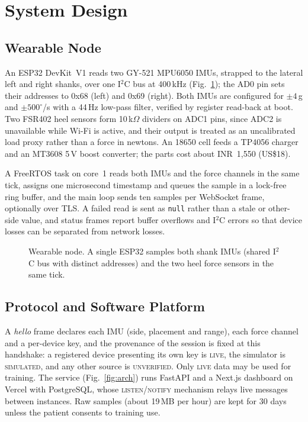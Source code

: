 \documentclass[conference]{IEEEtran}
\begin{document}
\section{System Design}

\subsection{Wearable Node}
An ESP32 DevKit~V1 reads two GY-521 MPU6050 IMUs, strapped to the lateral left and right shanks, over one I$^2$C bus at 400\,kHz (Fig.~\ref{fig:hw}); the AD0 pin sets their addresses to 0x68 (left) and 0x69 (right). Both IMUs are configured for $\pm4$\,g and $\pm500^\circ$/s with a 44\,Hz low-pass filter, verified by register read-back at boot. Two FSR402 heel sensors form 10\,k$\Omega$ dividers on ADC1 pins, since ADC2 is unavailable while Wi-Fi is active, and their output is treated as an uncalibrated load proxy rather than a force in newtons. An 18650 cell feeds a TP4056 charger and an MT3608 5\,V boost converter; the parts cost about INR~1{,}550 (US\$18).

A FreeRTOS task on core~1 reads both IMUs and the force channels in the same tick, assigns one microsecond timestamp and queues the sample in a lock-free ring buffer, and the main loop sends ten samples per WebSocket frame, optionally over TLS. A failed read is sent as \texttt{null} rather than a stale or other-side value, and status frames report buffer overflows and I$^2$C errors so that device losses can be separated from network losses.

\begin{figure}[t]
\centering

\caption{Wearable node. A single ESP32 samples both shank IMUs (shared I$^2$C bus with distinct addresses) and the two heel force sensors in the same tick.}
\label{fig:hw}
\end{figure}

\subsection{Protocol and Software Platform}
A \emph{hello} frame declares each IMU (side, placement and range), each force channel and a per-device key, and the provenance of the session is fixed at this handshake: a registered device presenting its own key is \textsc{live}, the simulator is \textsc{simulated}, and any other source is \textsc{unverified}. Only \textsc{live} data may be used for training. The service (Fig.~\ref{fig:arch}) runs FastAPI and a Next.js dashboard on Vercel with PostgreSQL, whose \textsc{listen/notify} mechanism relays live messages between instances. Raw samples (about 19\,MB per hour) are kept for 30 days unless the patient consents to training use.
\end{document}
